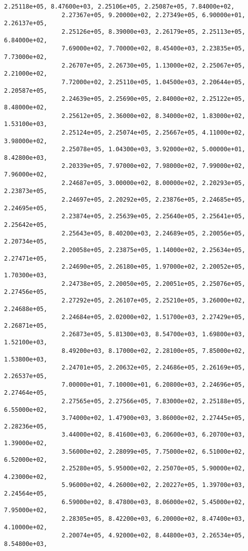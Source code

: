 \documentclass[11pt]{article}
\begin{document}
\begin{Verbatim}[commandchars=\\\{\}]
                2.25118e+05, 8.47600e+03, 2.25106e+05, 2.25087e+05, 7.84000e+02,
                2.27367e+05, 9.20000e+02, 2.27349e+05, 6.90000e+01, 2.26137e+05,
                2.25126e+05, 8.39000e+03, 2.26179e+05, 2.25113e+05, 6.84000e+02,
                7.69000e+02, 7.70000e+02, 8.45400e+03, 2.23835e+05, 7.73000e+02,
                2.26707e+05, 2.26730e+05, 1.13000e+02, 2.25067e+05, 2.21000e+02,
                7.72000e+02, 2.25110e+05, 1.04500e+03, 2.20644e+05, 2.20587e+05,
                2.24639e+05, 2.25690e+05, 2.84000e+02, 2.25122e+05, 8.48000e+02,
                2.25612e+05, 2.36000e+02, 8.34000e+02, 1.83000e+02, 1.53100e+03,
                2.25124e+05, 2.25074e+05, 2.25667e+05, 4.11000e+02, 3.98000e+02,
                2.25078e+05, 1.04300e+03, 3.92000e+02, 5.00000e+01, 8.42800e+03,
                2.20339e+05, 7.97000e+02, 7.98000e+02, 7.99000e+02, 7.96000e+02,
                2.24687e+05, 3.00000e+02, 8.00000e+02, 2.20293e+05, 2.23873e+05,
                2.24697e+05, 2.20292e+05, 2.23876e+05, 2.24685e+05, 2.24695e+05,
                2.23874e+05, 2.25639e+05, 2.25640e+05, 2.25641e+05, 2.25642e+05,
                2.25643e+05, 8.40200e+03, 2.24689e+05, 2.20056e+05, 2.20734e+05,
                2.20058e+05, 2.23875e+05, 1.14000e+02, 2.25634e+05, 2.27471e+05,
                2.24690e+05, 2.26180e+05, 1.97000e+02, 2.20052e+05, 1.70300e+03,
                2.24738e+05, 2.20050e+05, 2.20051e+05, 2.25076e+05, 2.27456e+05,
                2.27292e+05, 2.26107e+05, 2.25210e+05, 3.26000e+02, 2.24688e+05,
                2.24684e+05, 2.02000e+02, 1.51700e+03, 2.27429e+05, 2.26871e+05,
                2.26873e+05, 5.81300e+03, 8.54700e+03, 1.69800e+03, 1.52100e+03,
                8.49200e+03, 8.17000e+02, 2.28100e+05, 7.85000e+02, 1.53800e+03,
                2.24701e+05, 2.20632e+05, 2.24686e+05, 2.26169e+05, 2.26537e+05,
                7.00000e+01, 7.10000e+01, 6.20800e+03, 2.24696e+05, 2.27464e+05,
                2.27565e+05, 2.27566e+05, 7.83000e+02, 2.25188e+05, 6.55000e+02,
                3.74000e+02, 1.47900e+03, 3.86000e+02, 2.27445e+05, 2.28236e+05,
                3.44000e+02, 8.41600e+03, 6.20600e+03, 6.20700e+03, 1.39000e+02,
                3.56000e+02, 2.28099e+05, 7.75000e+02, 6.51000e+02, 6.52000e+02,
                2.25280e+05, 5.95000e+02, 2.25070e+05, 5.90000e+02, 4.23000e+02,
                5.96000e+02, 4.26000e+02, 2.20227e+05, 1.39700e+03, 2.24564e+05,
                6.59000e+02, 8.47800e+03, 8.06000e+02, 5.45000e+02, 7.95000e+02,
                2.28305e+05, 8.42200e+03, 6.20000e+02, 8.47400e+03, 4.10000e+02,
                2.20074e+05, 4.92000e+02, 8.44800e+03, 2.26534e+05, 8.54800e+03,

\end{Verbatim}
\end{document}
